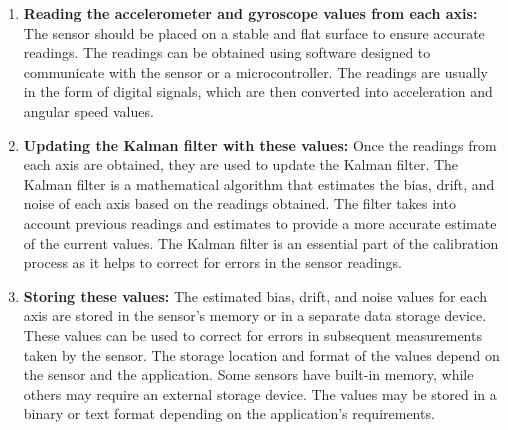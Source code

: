 \begin{itemize}
\begin{enumerate}
\item \textbf{Reading the accelerometer and gyroscope values from each axis: }\newline
    The sensor should be placed on a stable and flat surface to ensure accurate readings. The readings can be obtained using software designed to communicate with the sensor or a microcontroller. The readings are usually in the form of digital signals, which are then converted into acceleration and angular speed values.
 \item \textbf{Updating the Kalman filter with these values:}\newline
 Once the readings from each axis are obtained, they are used to update the Kalman filter. The Kalman filter is a mathematical algorithm that estimates the bias, drift, and noise of each axis based on the readings obtained. The filter takes into account previous readings and estimates to provide a more accurate estimate of the current values. The Kalman filter is an essential part of the calibration process as it helps to correct for errors in the sensor readings.
\item \textbf{Storing these values:}\newline
The estimated bias, drift, and noise values for each axis are stored in the sensor's memory or in a separate data storage device. These values can be used to correct for errors in subsequent measurements taken by the sensor. The storage location and format of the values depend on the sensor and the application. Some sensors have built-in memory, while others may require an external storage device. The values may be stored in a binary or text format depending on the application's requirements.

\end{enumerate}

%



\end{itemize}
